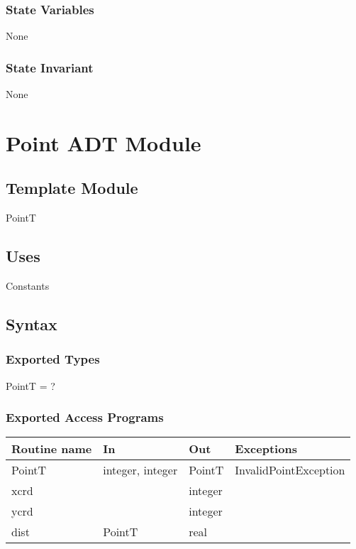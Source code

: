 \documentclass[12pt]{article}
\begin{document}
\subsubsection* {State Variables}

None

\subsubsection* {State Invariant}

None

\newpage

\section* {Point ADT Module}

\subsection*{Template Module}

PointT

\subsection* {Uses}

Constants

\subsection* {Syntax}

\subsubsection* {Exported Types}

PointT = ?

\subsubsection* {Exported Access Programs}

\begin{tabular}{| l | l | l | l |}
\hline
\textbf{Routine name} & \textbf{In} & \textbf{Out} & \textbf{Exceptions}\\
\hline
PointT & integer, integer & PointT & InvalidPointException\\
\hline
xcrd & ~ & integer & ~\\
\hline
ycrd & ~ & integer & ~\\
\hline
dist & PointT & real & ~\\
\hline
\end{tabular}
\end{document}
